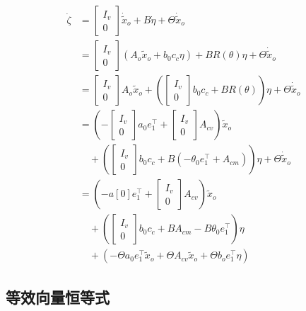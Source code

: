 \documentclass[12pt,a4paper]{article}
\begin{document}
\begin{align*}
\dot{\zeta}
&= \begin{bmatrix} I_v \\ 0 \end{bmatrix} \dot{\tilde{x}}_o + B\dot{\eta} + \Theta \dot{\tilde{x}}_o \\
&= \begin{bmatrix} I_v \\ 0 \end{bmatrix}(A_o \tilde{x}_o + b_0 c_c \eta) + B R(\theta) \eta + \Theta \dot{\tilde{x}}_o \\
&= \begin{bmatrix} I_v \\ 0 \end{bmatrix}A_o \tilde{x}_o
+ \left(\begin{bmatrix} I_v \\ 0 \end{bmatrix}b_0 c_c + B R(\theta) \right)\eta
+ \Theta \dot{\tilde{x}}_o \\
&= \left(-\begin{bmatrix} I_v \\ 0 \end{bmatrix}a_0 e_1^\top + \begin{bmatrix} I_v \\ 0 \end{bmatrix}A_{cv} \right)\tilde{x}_o \\
&\quad + \left(\begin{bmatrix} I_v \\ 0 \end{bmatrix}b_0 c_c + B(-\theta_0 e_1^\top + A_{cm}) \right)\eta + \Theta \dot{\tilde{x}}_o \\
&= \left( -a[0]e_1^\top + \begin{bmatrix} I_v \\ 0 \end{bmatrix}A_{cv} \right)\tilde{x}_o \\
&\quad + \left(\begin{bmatrix} I_v \\ 0 \end{bmatrix}b_0 c_c + B A_{cm} - B\theta_0 e_1^\top \right)\eta \\
&\quad + \left( -\Theta a_0 e_1^\top\tilde{x}_o + \Theta A_{cv}\tilde{x}_o + \Theta b_o e_1^\top\eta\right)
\end{align*}

\subsection{等效向量恒等式}
\end{document}

